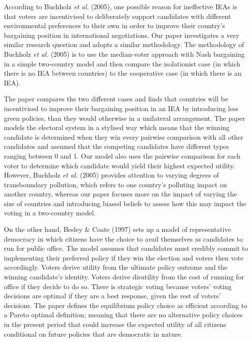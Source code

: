 \documentclass[11pt,preprint, authoryear]{elsarticle}
\numberwithin{equation}{section}
\numberwithin{figure}{section}
\numberwithin{table}{section}
\begin{document}
According to Buchholz \emph{et al.} (2005), one possible reason for
ineffective IEAs is that voters are incentivised to deliberately support
candidates with different environmental preferences to their own in
order to improve their country's bargaining position in international
negotiations. Our paper investigates a very similar research question
and adopts a similar methodology. The methodology of Buchholz \emph{et
al.} (2005) is to use the median-voter approach with Nash bargaining in
a simple two-country model and then compare the isolationist case (in
which there is no IEA between countries) to the cooperative case (in
which there is an IEA).

The paper compares the two different cases and finds that countries will
be incentivised to improve their bargaining position in an IEA by
introducing less green policies, than they would otherwise in a
unilateral arrangement. The paper models the electoral system in a
stylised way which means that the winning candidate is determined when
they win every pairwise comparison with all other candidates and assumed
that the competing candidates have different types ranging between 0 and
1. Our model also uses the pairwise comparison for each voter to
determine which candidate would yield their highest expected utility.
However, Buchholz \emph{et al.} (2005) provides attention to varying
degrees of transboundary pollution, which refers to one country's
polluting impact on another country, whereas our paper focuses more on
the impact of varying the size of countries and introducing biased
beliefs to assess how this may impact the voting in a two-country model.

On the other hand, Besley \& Coate (1997) sets up a model of
representative democracy in which citizens have the choice to avail
themselves as candidates to run for public office. The model assumes
that candidates must credibly commit to implementing their preferred
policy if they win the election and voters then vote accordingly. Voters
derive utility from the ultimate policy outcome and the winning
candidate's identity. Voters derive disutility from the cost of running
for office if they decide to do so. There is strategic voting because
voters' voting decisions are optimal if they are a best response, given
the rest of voters' decisions. The paper defines the equilibrium policy
choice as efficient according to a Pareto optimal definition; meaning
that there are no alternative policy choices in the present period that
could increase the expected utility of all citizens conditional on
future policies that are democratic in nature.
\end{document}
